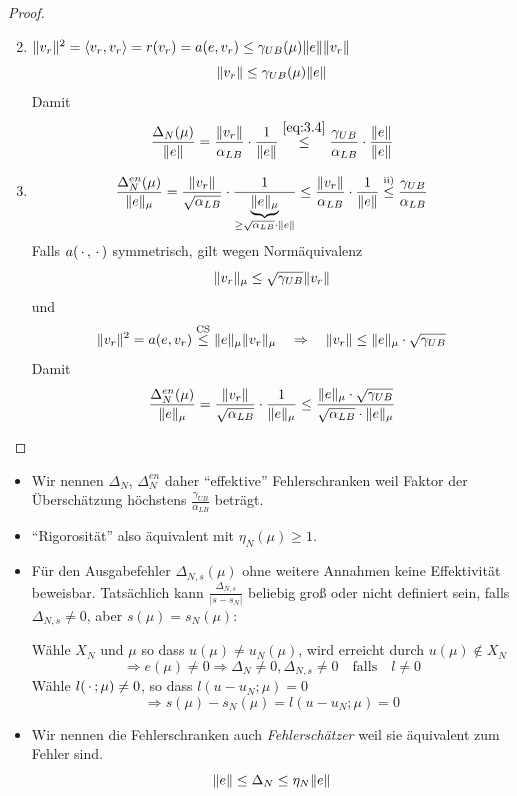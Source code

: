 \begin{satz}
	\begin{proof} \beginwithlistbew
		\begin{enumerate}
			\setcounter{enumi}{1}
			\item $\|v_r\|^2 = \langle v_r, v_r \rangle = r(v_r) = a(e,v_r) \leq \gamma_{UB}(\mu) \|e\| \|v_r\|$
				\begin{equation} \label{eq:3.4}
					\|v_r\| \leq \gamma_{UB}(\mu) \|e\|
				\end{equation}
				Damit
				\[
					\frac{\Delta_N(\mu)}{\|e\|} = \frac{\|v_r\|}{\alpha_{LB}} \cdot \frac{1}{\|e\|} \stackrel{\eqref{eq:3.4}}{\leq} \frac{\gamma_{UB}}{\alpha_{LB}} \cdot \frac{\|e\|}{\|e\|}
				\]
			\setcounter{enumi}{0}
			\item
				\[
					\frac{\Delta_N^{en}(\mu)}{\|e\|_\mu} = \frac{\|v_r\|}{\sqrt{\alpha_{LB}}} \cdot \frac{1}{\underbrace{\|e\|_\mu}_{\geq \sqrt{\alpha_{LB}} \cdot \|e\|}} \leq \frac{\|v_r\|}{\alpha_{LB}} \cdot \frac{1}{\|e\|} \stackrel{\text{ii)}}{\leq} \frac{\gamma_{UB}}{\alpha_{LB}}
				\]
				Falls $a(\,\cdot\,,\,\cdot\,)$ symmetrisch, gilt wegen Normäquivalenz
				\[
					\|v_r\|_\mu \leq \sqrt{\gamma_{UB}} \|v_r\|
				\]
				und
				\[
					\|v_r\|^2 = a(e,v_r) \stackrel{\text{CS}}{\leq} \|e\|_\mu \|v_r\|_\mu \quad \Rightarrow \quad \|v_r\| \leq \|e\|_\mu \cdot \sqrt{\gamma_{UB}}
				\]
				Damit
				\[
					\frac{\Delta_N^{en}(\mu)}{\|e\|_\mu} = \frac{\|v_r\|}{\sqrt{\alpha_{LB}}} \cdot \frac{1}{\|e\|_\mu} \leq \frac{\|e\|_\mu \cdot \sqrt{\gamma_{UB}}}{\sqrt{\alpha_{LB}} \cdot \|e\|_\mu}
				\]
		\end{enumerate}
	\end{proof}
\end{satz}

\begin{bem} \beginwithlistbem
	\begin{itemize}
		\item Wir nennen $\Delta_N$, $\Delta_N^{en}$ daher ``effektive'' Fehlerschranken weil Faktor der Überschätzung höchstens $\frac{\gamma_{UB}}{\alpha_{LB}}$ beträgt.
		\item ``Rigorosität'' also äquivalent mit $\eta_N(\mu) \geq 1$.
		\item Für den Ausgabefehler $\Delta_{N,s}(\mu)$ ohne weitere Annahmen keine Effektivität beweisbar.
			Tatsächlich kann $\frac{\Delta_{N,s}}{|s-s_N|}$ beliebig groß oder nicht definiert sein, falls $\Delta_{N,s} \neq 0$, aber $s(\mu) = s_N(\mu)$:

			Wähle $X_N$ und $\mu$ so dass $u(\mu) \neq u_N(\mu)$, wird erreicht durch $u(\mu) \not\in X_N$
			\[
				\Rightarrow e(\mu) \neq 0 \Rightarrow \Delta_N \neq 0, \Delta_{N,s} \neq 0 \quad \text{falls} \quad l \neq 0
			\]
			Wähle $l(\,\cdot\,;\mu) \neq 0$, so dass $l(u-u_N;\mu) = 0$
			\[
				\Rightarrow s(\mu)-s_N(\mu) = l(u-u_N;\mu) = 0
			\]
		\item Wir nennen die Fehlerschranken auch \emph{Fehlerschätzer} weil sie äquivalent zum Fehler sind.
			\[
				\|e\| \leq \Delta_N \leq \eta_N \|e\|
			\]
	\end{itemize}
\end{bem}

